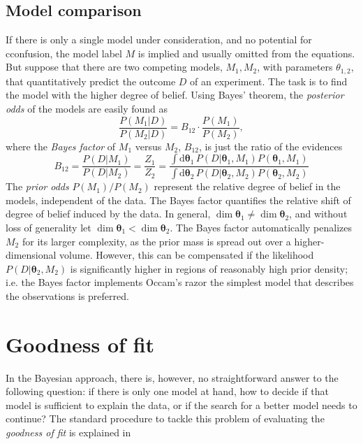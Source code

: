 \documentclass[
12pt,
a4paper,
bibliography=totoc,
captions=nooneline, %
numbers=noenddot,
twoside]{scrbook}
\newcommand{\fred}[1]{{\todo[color=orange]{Fred: #1}}}
\newcommand\rmdx[1]{\mbox{d}#1\,} %
\newcommand{\scath}{\theta} %
\newcommand{\vecth}{\bm{\theta}} %
\begin{document}
\subsection{Model comparison} \label{sec:model-comparison}

If there is only a single model under consideration, and no potential for
cconfusion, the model label $M$ is implied and usually omitted from the
equations. But suppose that there are two competing models, $M_1, M_2$, with
parameters $\scath_{1,2}$, that quantitatively predict the outcome $D$ of an
experiment. The task is to find the model with the higher degree of
belief. Using Bayes' theorem, the \emph{posterior odds} of the models are easily
found as
\begin{equation}
  \label{eq:post-odds}
  \frac{P(M_1|D)}{P(M_2|D)}
   = B_{12}  \cdot  \frac{P(M_1)}{P(M_2)},
\end{equation}
 where the \emph{Bayes factor} of $M_1$ versus $M_2$, $B_{12}$, is just the ratio
of the evidences
\begin{equation}
  \label{eq:Bayes-factor}
  B_{12}= \dfrac{P(D|M_1)}{P(D|M_2)} = \frac{Z_1}{Z_2}
  = \frac{\int \rmdx{\vecth_1} P(D|\vecth_1, M_1) P(\vecth_1, M_1)}
  {\int \rmdx{ \vecth_2} P(D|\vecth_2, M_2) P(\vecth_2, M_2)}
\end{equation}
The \emph{prior odds} $P(M_1)/P(M_2)$ represent the relative degree of belief
in the models, independent of the data.
The Bayes factor quantifies the relative shift of degree of belief
induced by the data. In general, $\dim \vecth_1 \ne \dim \vecth_2$,
and without loss of generality let $\dim \vecth_1 < \dim
\vecth_2$. The Bayes factor automatically penalizes $M_2$ for its
larger complexity, as the prior mass is spread out over a
higher-dimensional volume. However, this can be compensated if the
likelihood $P(D|\vecth_2, M_2)$ is significantly higher in regions of
reasonably high prior density; i.e. the Bayes factor implements
Occam's razor the simplest model that describes the observations is
preferred.

\section{Goodness of fit} \label{sec:goodness-fit}
In the Bayesian approach, there is, however, no straightforward answer to the
following question: if there is only one model at hand, how to decide if that
model is sufficient to explain the data, or if the search for a better model
needs to continue?  The standard procedure to tackle this problem of evaluating
the \emph{goodness of fit} is explained in \fred{expand}
\end{document}
